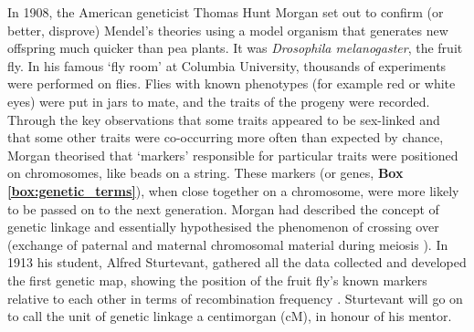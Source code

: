 In 1908, the American geneticist Thomas Hunt Morgan set out to confirm (or better, disprove) Mendel’s theories using a model organism that generates new offspring much quicker than pea plants. 
It was \textit{Drosophila melanogaster}, the fruit fly. 
In his famous `fly room' at Columbia University, thousands of experiments were performed on flies. 
Flies with known phenotypes (for example red or white eyes) were put in jars to mate, and the traits of the progeny were recorded. 
Through the key observations that some traits appeared to be sex-linked and that some other traits were co-occurring more often than expected by chance, Morgan theorised that `markers' responsible for particular traits were positioned on chromosomes, like beads on a string. 
These markers (or genes, \textbf{Box \ref{box:genetic_terms}}), when close together on a chromosome, were more likely to be passed on to the next generation. 
Morgan had described the concept of genetic linkage and essentially hypothesised the phenomenon of crossing over (exchange of paternal and maternal chromosomal material during meiosis \cite{morgan1911random}). 
In 1913 his student, Alfred Sturtevant, gathered all the data collected and developed the first genetic map, showing the position of the fruit fly’s known markers relative to each other in terms of recombination frequency \cite{sturtevant1913linear}. 
Sturtevant will go on to call the unit of genetic linkage a centimorgan (cM), in honour of his mentor.\\




